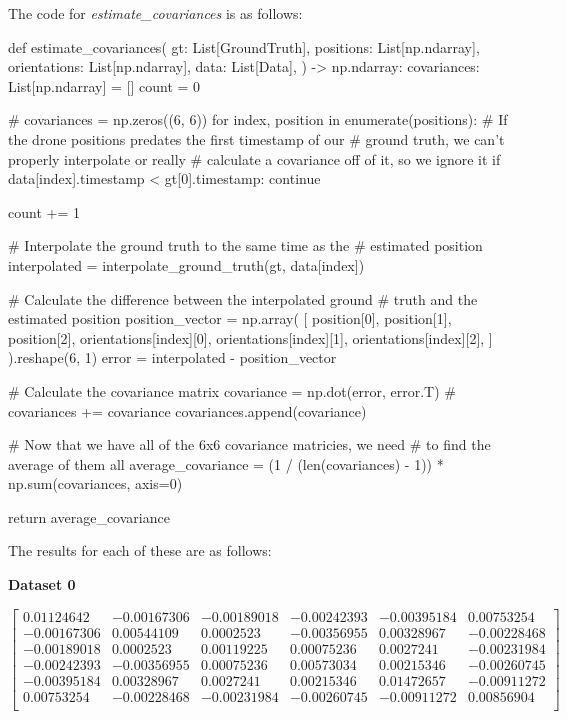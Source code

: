 \documentclass{article}
\begin{document}
The code for \textit{estimate\_covariances} is as follows:

\begin{python}
    def estimate_covariances(
    gt: List[GroundTruth],
    positions: List[np.ndarray],
    orientations: List[np.ndarray],
    data: List[Data],
    ) -> np.ndarray:
    covariances: List[np.ndarray] = []
    count = 0

    # covariances = np.zeros((6, 6))
    for index, position in enumerate(positions):
    # If the drone positions predates the first timestamp of our
    # ground truth, we can't properly interpolate or really
    # calculate a covariance off of it, so we ignore it
    if data[index].timestamp < gt[0].timestamp:
    continue

    count += 1

    # Interpolate the ground truth to the same time as the
    # estimated position
    interpolated = interpolate_ground_truth(gt, data[index])

    # Calculate the difference between the interpolated ground
    # truth and the estimated position
    position_vector = np.array(
    [
            position[0],
            position[1],
            position[2],
            orientations[index][0],
            orientations[index][1],
            orientations[index][2],
        ]
    ).reshape(6, 1)
    error = interpolated - position_vector

    # Calculate the covariance matrix
    covariance = np.dot(error, error.T)
    # covariances += covariance
    covariances.append(covariance)

    # Now that we have all of the 6x6 covariance matricies, we need
    # to find the average of them all
    average_covariance = (1 / (len(covariances) - 1)) * np.sum(covariances, axis=0)

    return average_covariance
\end{python}

The results for each of these are as follows:

\noindent\textbf{Dataset 0}

\begin{equation}
    \begin{bmatrix}
        0.01124642  & -0.00167306 & -0.00189018 & -0.00242393 & -0.00395184 & 0.00753254  \\
        -0.00167306 & 0.00544109  & 0.0002523   & -0.00356955 & 0.00328967  & -0.00228468 \\
        -0.00189018 & 0.0002523   & 0.00119225  & 0.00075236  & 0.0027241   & -0.00231984 \\
        -0.00242393 & -0.00356955 & 0.00075236  & 0.00573034  & 0.00215346  & -0.00260745 \\
        -0.00395184 & 0.00328967  & 0.0027241   & 0.00215346  & 0.01472657  & -0.00911272 \\
        0.00753254  & -0.00228468 & -0.00231984 & -0.00260745 & -0.00911272 & 0.00856904  \\
    \end{bmatrix}
\end{equation}
\end{document}
